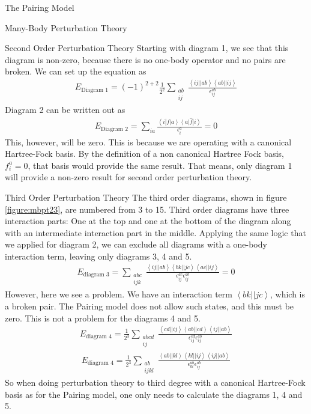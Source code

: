 \documentclass[twoside,english]{uiofysmaster}
\begin{document}
\begin{chapter}{The Pairing Model}
\begin{section}{Many-Body Perturbation Theory}
		\begin{subsection}{Second Order Perturbation Theory}
			Starting with diagram 1, we see that this diagram is non-zero, because there is no one-body operator and no pairs are broken. We can set up the equation as
			\begin{align}
				E_\text{Diagram 1} = (-1)^{2+2} \frac{1}{2^2} \sum_{\substack{ab \\ ij}} \frac{\left< ij || ab \right> \left< ab || ij \right>}{\epsilon_{ij}^{ab}}
			\end{align}
			Diagram 2 can be written out as
			\begin{align}
				E_\text{Diagram 2} = \sum_{ia} \frac{\left<i\right|f\left|a\right> \left<a\right| \hat f \left| i \right>}{\epsilon_i^a} = 0
			\end{align}
			This, however, will be zero. This is because we are operating with a canonical Hartree-Fock basis. By the definition of a non canonical Hartree Fock basis, $f_i^a = 0$, that basis would provide the same result. That means, only diagram 1 will provide a non-zero result for second order perturbation theory. 

		\end{subsection}

		\begin{subsection}{Third Order Perturbation Theory}
			The third order diagrams, shown in figure \ref{figure:mbpt23}, are numbered from 3 to 15. Third order diagrams have three interaction parts: One at the top and one at the bottom of the diagram along with an intermediate interaction part in the middle. Applying the same logic that we applied for diagram 2, we can exclude all diagrams with a one-body interaction term, leaving only diagrams 3, 4 and 5. 
			\begin{align}
				E_{\text{diagram 3}} = \sum_{\substack{abc \\ ijk}} \frac{\left<ij||ab\right>\left<bk||jc\right>\left<ac||ij\right>}{\epsilon_{ij}^{ac} \epsilon_{ij}^{ab}} = 0
			\end{align}
			However, here we see a problem. We have an interaction term $\left<bk||jc\right>$, which is a broken pair. The Pairing model does not allow such states, and this must be zero. This is not a problem for the diagrams 4 and 5. 
			\begin{align}
				E_{\text{diagram 4}} = \frac{1}{2^3} \sum_{\substack{abcd \\ ij}} \frac{\left<cd||ij\right>\left<ab||cd\right>\left<ij||ab\right>}{\epsilon_{ij}^{cd} \epsilon_{ij}^{ab}}
			\end{align}
			\begin{align}
				E_{\text{diagram 4}} = \frac{1}{2^3} \sum_{\substack{ab \\ ijkl}} \frac{\left<ab||kl\right>\left<kl||ij\right>\left<ij||ab\right>}{\epsilon_{kl}^{ab} \epsilon_{ij}^{ab}}
			\end{align}
			So when doing perturbation theory to third degree with a canonical Hartree-Fock basis as for the Pairing model, one only needs to calculate the diagrams 1, 4 and 5. 


\end{subsection}
\end{section}
\end{chapter}
\end{document}
